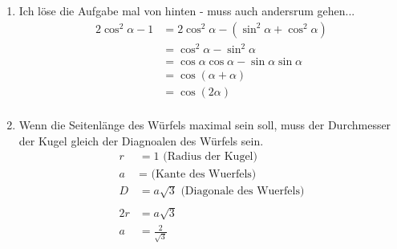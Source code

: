 \begin{enumerate}
\item %
 
 \par Ich l\"ose die Aufgabe mal von hinten - muss auch andersrum gehen...
 \begin{align*}
 2\cos^2\alpha -1 & = 2\cos^2\alpha - (\sin^2\alpha + \cos^2\alpha) \\
 									& = \cos^2\alpha - \sin^2\alpha \\
 							 & = \cos\alpha \cos\alpha  - \sin\alpha \sin\alpha \\
 							 & = \cos(\alpha+\alpha) \\
 							 & = \cos(2\alpha) \\
 \end{align*}
 
 
\item %
 \par
 Wenn die Seitenl\"ange des W\"urfels maximal sein soll, muss der Durchmesser der Kugel gleich der Diagnoalen des W\"urfels sein.
 \newline
 \begin{align*}
 r &= 1  \text{   (Radius der Kugel)}\\
 a &= \text{   (Kante des Wuerfels)}\\
 D &= a\sqrt{3} \text{   (Diagonale des Wuerfels)}\\
 \\
 2r &= a\sqrt{3}\\
 a &= \frac{2}{\sqrt{3}}\\
 \end{align*} 
 \end{enumerate}
   
   
   
